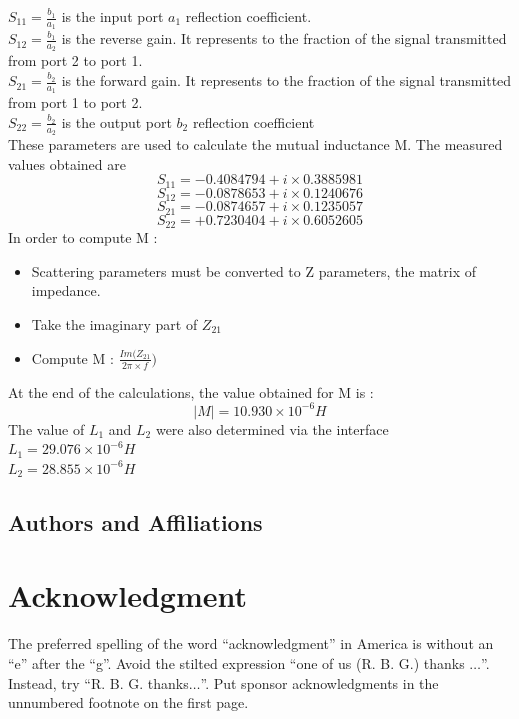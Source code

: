 \documentclass[conference]{IEEEtran}
\begin{document}
\(S_{11} = \frac{b_1}{a_1}\) is the input port \(a_1\) reflection coefficient. \\

\(S_{12} = \frac{b_1}{a_2}\) is the reverse gain. It represents to the fraction of the signal transmitted from
port 2 to port 1. \\

\(S_{21} = \frac{b_2}{a_1}\) is the forward gain. It represents to the fraction of the signal transmitted from
port 1 to port 2. \\

\(S_{22} = \frac{b_2}{a_2}\) is the output port \(b_2\) reflection coefficient \\

These parameters are used to calculate the mutual inductance M. The measured values
obtained are
\[
S_{11} = -0.4084794 + i \times 0.3885981
\]
\[
S_{12} = -0.0878653 + i \times 0.1240676
\]
\[
S_{21} = -0.0874657 + i \times 0.1235057
\]
\[
S_{22} = +0.7230404 + i \times 0.6052605
\]
In order to compute M :
\begin{itemize}
	\item Scattering parameters must be converted to Z parameters, the matrix
	of impedance.
	\item Take the imaginary part of \(Z_{21}\)
	\item Compute M : \(\frac{Im(Z_{21}}{2\pi \times f})\)
\end{itemize}
At the end of the calculations, the value obtained for M is :
$$ |M| = 10.930 \times 10^{-6} H $$
The value of \(L_1\) and \(L_2\) were also determined via the interface
$ L_1 = 29.076 \times 10^{-6} H$ \\
$ L_2 = 28.855 \times 10^{-6} H$





\subsection{Authors and Affiliations}


\section*{Acknowledgment}

The preferred spelling of the word ``acknowledgment'' in America is without 
an ``e'' after the ``g''. Avoid the stilted expression ``one of us (R. B. 
G.) thanks $\ldots$''. Instead, try ``R. B. G. thanks$\ldots$''. Put sponsor 
acknowledgments in the unnumbered footnote on the first page.
\end{document}
